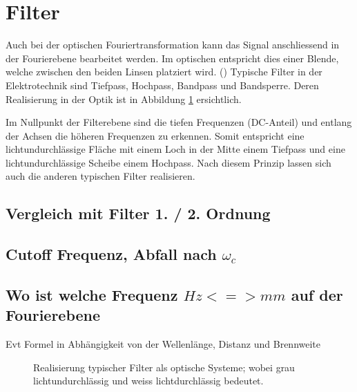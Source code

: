 %
%
%
%
\section{Filter
\label{opt:section:filter}}

Auch bei der optischen Fouriertransformation kann das Signal anschliessend in der Fourierebene bearbeitet werden.
Im optischen entspricht dies einer Blende, welche zwischen den beiden Linsen platziert wird. 
()
Typische Filter in der Elektrotechnik sind Tiefpass, Hochpass, Bandpass und Bandsperre.
Deren Realisierung in der Optik ist in Abbildung \ref{opt:fig:filterarten} ersichtlich.

Im Nullpunkt der Filterebene sind die tiefen Frequenzen (DC-Anteil) und entlang der Achsen die höheren Frequenzen zu erkennen.
Somit entspricht eine lichtundurchlässige Fläche mit einem Loch in der Mitte einem Tiefpass und eine lichtundurchlässige Scheibe einem Hochpass.
Nach diesem Prinzip lassen sich auch die anderen typischen Filter realisieren.

\subsection{Vergleich mit Filter 1. / 2. Ordnung}

\subsection{Cutoff Frequenz, Abfall nach $\omega_c$}

\subsection{Wo ist welche Frequenz $Hz <=> mm$ auf der Fourierebene}
Evt Formel in Abhängigkeit von der Wellenlänge, Distanz und Brennweite

\begin{figure}
    \centering

    \hfill
    \hfill
    \hfill
    \caption{Realisierung typischer Filter als optische Systeme;
        wobei grau lichtundurchlässig und weiss lichtdurchlässig bedeutet.}
    \label{opt:fig:filterarten}
\end{figure}
